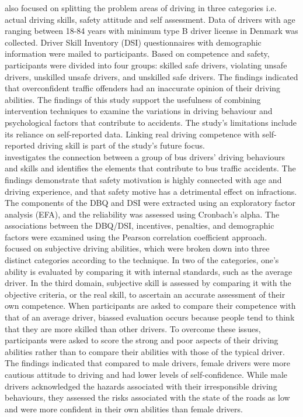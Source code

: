 \documentclass[12pt,letterpaper]{report}
\begin{document}
\textbf{\cite{martinussen2014assessing}} also focused on splitting the problem areas of driving in three categories i.e. actual driving skills, safety attitude and self assessment. Data of drivers with age ranging between 18-84 years with minimum type B driver license in Denmark was collected. Driver Skill Inventory (DSI) questionnaires with demographic information were mailed to participants. Based on competence and safety, participants were divided into four groups: skilled safe drivers, violating unsafe drivers, unskilled unsafe drivers, and unskilled safe drivers. The findings indicated that overconfident traffic offenders had an inaccurate opinion of their driving abilities. The findings of this study support the usefulness of combining intervention techniques to examine the variations in driving behaviour and psychological factors that contribute to accidents. The study's limitations include its reliance on self-reported data. Linking real driving competence with self-reported driving skill is part of the study's future focus.\\

\textbf{\cite{zhang2019assessment}} investigates the connection between a group of bus drivers' driving behaviours and skills and identifies the elements that contribute to bus traffic accidents. The findings demonstrate that safety motivation is highly connected with age and driving experience, and that safety motive has a detrimental effect on infractions. The components of the DBQ and DSI were extracted using an exploratory factor analysis (EFA), and the reliability was assessed using Cronbach's alpha. The associations between the DBQ/DSI, incentives, penalties, and demographic factors were examined using the Pearson correlation coefficient approach.\\

\textbf{\cite{sundstrom2008self}} focused on subjective driving abilities, which were broken down into three distinct categories according to the technique. In two of the categories, one's ability is evaluated by comparing it with internal standards, such as the average driver. In the third domain, subjective skill is assessed by comparing it with the objective criteria, or the real skill, to ascertain an accurate assessment of their own competence. When participants are asked to compare their competence with that of an average driver, biassed evaluation occurs because people tend to think that they are more skilled than other drivers. To overcome these issues, participants were asked to score the strong and poor aspects of their driving abilities rather than to compare their abilities with those of the typical driver. The findings indicated that compared to male drivers, female drivers were more cautious attitude to driving  and had lower levels of self-confidence. While male drivers acknowledged the hazards associated with their irresponsible driving behaviours, they assessed the risks associated with the state of the roads as low and were more confident in their own abilities than female drivers.\\
\end{document}
